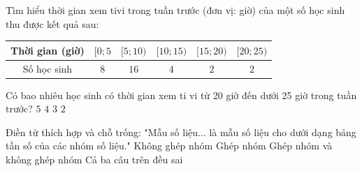 \begin{ex}%
	Tìm hiểu thời gian xem tivi trong tuần trước (đơn  vị: giờ) của một số học sinh thu được kết quả sau:
	\begin{center}
		\begin{tabular}{|c|c|c|c|c|c|}
			\hline 
			Thời gian (giờ) & $[0{;}5$ & $[5{;}10)$ & $[10{;}15)$ &  $[15{;}20)$ & $[20{;}25)$ \\
			\hline 
			Số học sinh & $8$ &  $16$ & $4$ & $2$ & $2$ \\
			\hline 
		\end{tabular}
	\end{center}
	Có bao nhiêu học sinh có thời gian xem ti vi từ 20 giờ  đến dưới 25 giờ trong tuần trước?
	 \choice
		{$5$} 
		{$4$} 
		{$3$} 
		{\True $2$} 
\end{ex}

\begin{ex}%
	Điền từ  thích hợp và chỗ trống: "Mẫu số liệu... là mẫu số liệu cho dưới dạng bảng tần số của các nhóm số liệu."
	\choice 
		{Không ghép  nhóm}
		{\True Ghép  nhóm}
		 {Ghép nhóm và không ghép nhóm}
		{Cả ba câu trên đều  sai}
\end{ex}

